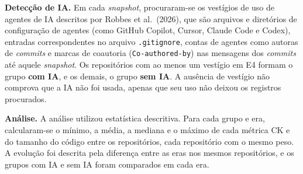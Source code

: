 \textbf{Detecção de IA.} Em cada \emph{snapshot}, procuraram-se os vestígios de uso de agentes de IA descritos por Robbes et al.\ (2026)\nocite{robbes:26}, que são arquivos e diretórios de configuração de agentes (como GitHub Copilot, Cursor, Claude Code e Codex), entradas correspondentes no arquivo \texttt{.gitignore}, contas de agentes como autoras de \emph{commits} e marcas de coautoria (\texttt{Co-authored-by}) nas mensagens dos \emph{commits} até aquele \emph{snapshot}. Os repositórios com ao menos um vestígio em E4 formam o grupo \textbf{com IA}, e os demais, o grupo \textbf{sem IA}. A ausência de vestígio não comprova que a IA não foi usada, apenas que seu uso não deixou os registros procurados.

\textbf{Análise.} A análise utilizou estatística descritiva. Para cada grupo e era, calcularam-se o mínimo, a média, a mediana e o máximo de cada métrica CK e do tamanho do código entre os repositórios, cada repositório com o mesmo peso. A evolução foi descrita pela diferença entre as eras nos mesmos repositórios, e os grupos com IA e sem IA foram comparados em cada era.
